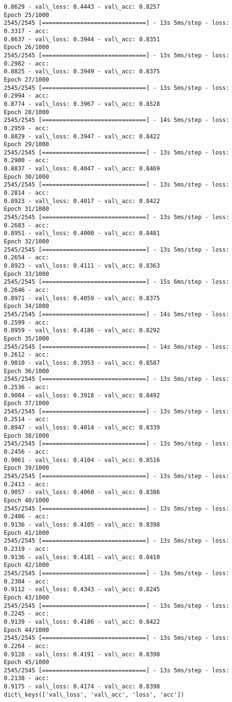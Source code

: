 \documentclass[11pt]{article}
\begin{document}
\begin{Verbatim}[commandchars=\\\{\}]
0.8629 - val\_loss: 0.4443 - val\_acc: 0.8257
Epoch 25/1000
2545/2545 [==============================] - 13s 5ms/step - loss: 0.3317 - acc:
0.8637 - val\_loss: 0.3944 - val\_acc: 0.8351
Epoch 26/1000
2545/2545 [==============================] - 13s 5ms/step - loss: 0.2982 - acc:
0.8825 - val\_loss: 0.3949 - val\_acc: 0.8375
Epoch 27/1000
2545/2545 [==============================] - 13s 5ms/step - loss: 0.2994 - acc:
0.8774 - val\_loss: 0.3967 - val\_acc: 0.8528
Epoch 28/1000
2545/2545 [==============================] - 14s 5ms/step - loss: 0.2959 - acc:
0.8829 - val\_loss: 0.3947 - val\_acc: 0.8422
Epoch 29/1000
2545/2545 [==============================] - 13s 5ms/step - loss: 0.2900 - acc:
0.8837 - val\_loss: 0.4047 - val\_acc: 0.8469
Epoch 30/1000
2545/2545 [==============================] - 13s 5ms/step - loss: 0.2814 - acc:
0.8923 - val\_loss: 0.4017 - val\_acc: 0.8422
Epoch 31/1000
2545/2545 [==============================] - 13s 5ms/step - loss: 0.2683 - acc:
0.8951 - val\_loss: 0.4000 - val\_acc: 0.8481
Epoch 32/1000
2545/2545 [==============================] - 13s 5ms/step - loss: 0.2654 - acc:
0.8923 - val\_loss: 0.4111 - val\_acc: 0.8363
Epoch 33/1000
2545/2545 [==============================] - 15s 6ms/step - loss: 0.2646 - acc:
0.8971 - val\_loss: 0.4059 - val\_acc: 0.8375
Epoch 34/1000
2545/2545 [==============================] - 14s 5ms/step - loss: 0.2599 - acc:
0.8959 - val\_loss: 0.4186 - val\_acc: 0.8292
Epoch 35/1000
2545/2545 [==============================] - 14s 5ms/step - loss: 0.2612 - acc:
0.9010 - val\_loss: 0.3953 - val\_acc: 0.8587
Epoch 36/1000
2545/2545 [==============================] - 13s 5ms/step - loss: 0.2536 - acc:
0.9084 - val\_loss: 0.3918 - val\_acc: 0.8492
Epoch 37/1000
2545/2545 [==============================] - 13s 5ms/step - loss: 0.2514 - acc:
0.8947 - val\_loss: 0.4014 - val\_acc: 0.8339
Epoch 38/1000
2545/2545 [==============================] - 13s 5ms/step - loss: 0.2456 - acc:
0.9061 - val\_loss: 0.4104 - val\_acc: 0.8516
Epoch 39/1000
2545/2545 [==============================] - 13s 5ms/step - loss: 0.2413 - acc:
0.9057 - val\_loss: 0.4060 - val\_acc: 0.8386
Epoch 40/1000
2545/2545 [==============================] - 13s 5ms/step - loss: 0.2406 - acc:
0.9136 - val\_loss: 0.4105 - val\_acc: 0.8398
Epoch 41/1000
2545/2545 [==============================] - 13s 5ms/step - loss: 0.2319 - acc:
0.9136 - val\_loss: 0.4181 - val\_acc: 0.8410
Epoch 42/1000
2545/2545 [==============================] - 13s 5ms/step - loss: 0.2304 - acc:
0.9112 - val\_loss: 0.4343 - val\_acc: 0.8245
Epoch 43/1000
2545/2545 [==============================] - 13s 5ms/step - loss: 0.2245 - acc:
0.9139 - val\_loss: 0.4186 - val\_acc: 0.8422
Epoch 44/1000
2545/2545 [==============================] - 13s 5ms/step - loss: 0.2264 - acc:
0.9128 - val\_loss: 0.4191 - val\_acc: 0.8398
Epoch 45/1000
2545/2545 [==============================] - 13s 5ms/step - loss: 0.2138 - acc:
0.9175 - val\_loss: 0.4174 - val\_acc: 0.8398
dict\_keys(['val\_loss', 'val\_acc', 'loss', 'acc'])
\end{Verbatim}
\end{document}
